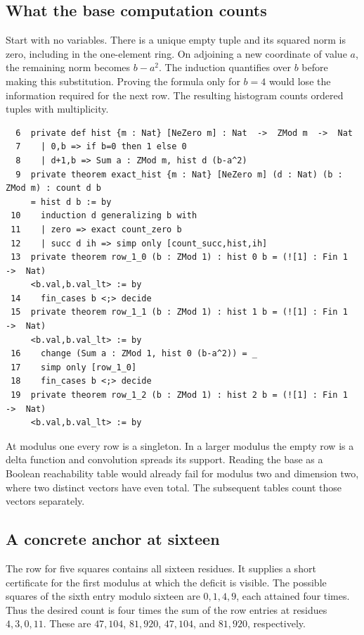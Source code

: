 \documentclass[12pt,letterpaper]{article}
\begin{document}
\clearpage{}\subsection*{What the base computation counts}\label{extract-FourBase6}
Start with no variables. There is a unique empty tuple and its squared norm is zero, including in the one-element ring. On adjoining a new coordinate of value $a$, the remaining norm becomes $b-a^2$. The induction quantifies over $b$ before making this substitution. Proving the formula only for $b=4$ would lose the information required for the next row. The resulting histogram counts ordered tuples with multiplicity.
\par
{\fontsize{9.2}{11.2}\selectfont\begin{verbatim}
  6  private def hist {m : Nat} [NeZero m] : Nat  ->  ZMod m  ->  Nat
  7    | 0,b => if b=0 then 1 else 0
  8    | d+1,b => Sum a : ZMod m, hist d (b-a^2)
  9  private theorem exact_hist {m : Nat} [NeZero m] (d : Nat) (b : ZMod m) : count d b
     = hist d b := by
 10    induction d generalizing b with
 11    | zero => exact count_zero b
 12    | succ d ih => simp only [count_succ,hist,ih]
 13  private theorem row_1_0 (b : ZMod 1) : hist 0 b = (![1] : Fin 1  ->  Nat)
     <b.val,b.val_lt> := by
 14    fin_cases b <;> decide
 15  private theorem row_1_1 (b : ZMod 1) : hist 1 b = (![1] : Fin 1  ->  Nat)
     <b.val,b.val_lt> := by
 16    change (Sum a : ZMod 1, hist 0 (b-a^2)) = _
 17    simp only [row_1_0]
 18    fin_cases b <;> decide
 19  private theorem row_1_2 (b : ZMod 1) : hist 2 b = (![1] : Fin 1  ->  Nat)
     <b.val,b.val_lt> := by
\end{verbatim}}
At modulus one every row is a singleton. In a larger modulus the empty row is a delta function and convolution spreads its support. Reading the base as a Boolean reachability table would already fail for modulus two and dimension two, where two distinct vectors have even total. The subsequent tables count those vectors separately.
\clearpage{}\subsection*{A concrete anchor at sixteen}\label{extract-FourBase139}
The row for five squares contains all sixteen residues. It supplies a short certificate for the first modulus at which the deficit is visible. The possible squares of the sixth entry modulo sixteen are $0,1,4,9$, each attained four times. Thus the desired count is four times the sum of the row entries at residues $4,3,0,11$. These are $47{,}104$, $81{,}920$, $47{,}104$, and $81{,}920$, respectively.
\end{document}
